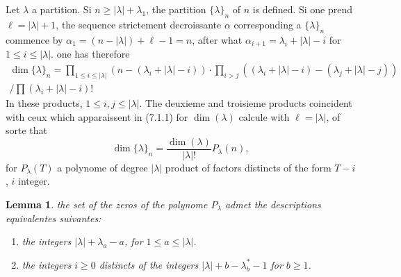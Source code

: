\documentclass[11pt,a4paper]{article}
\theoremstyle{plain}
\newtheorem{lemma}[theorem]{Lemma}
\theoremstyle{definition}
\begin{document}
\subsection{}
Let $\lambda$ a partition. Si $n \geq |\lambda| + \lambda_1$, the partition $\{\lambda\}_n$ of $n$ is defined. Si one prend $\ell = |\lambda| + 1$, the sequence strictement decroissante $\alpha$ corresponding a $\{\lambda\}_n$ commence by $\alpha_1 = (n - |\lambda|) + \ell - 1 = n$, after what $\alpha_{i+1} = \lambda_i + |\lambda| - i$ for $1 \leq i \leq |\lambda|$. one has therefore
\begin{multline}
\dim \{\lambda\}_n = \prod_{1 \leq i \leq |\lambda|} (n - (\lambda_i + |\lambda| - i)) \cdot \prod_{i > j} ((\lambda_i + |\lambda| - i) - (\lambda_j + |\lambda| - j)) \\
/ \prod (\lambda_i + |\lambda| - i)! \tag{7.2.1}
\end{multline}
In these products, $1 \leq i, j \leq |\lambda|$. The deuxieme and troisieme products coincident with ceux which apparaissent in (7.1.1) for $\dim(\lambda)$ calcule with $\ell = |\lambda|$, of sorte that
\begin{equation}
\dim \{\lambda\}_n = \frac{\dim(\lambda)}{|\lambda|!} P_\lambda(n), \tag{7.2.2}
\end{equation}
for $P_\lambda(T)$ a polynome of degree $|\lambda|$ product of factors distincts of the form $T - i$, $i$ integer.

\begin{lemma}
the set of the zeros of the polynome $P_\lambda$ admet the descriptions equivalentes suivantes:
\begin{enumerate}[label=(\roman*)]
\item the integers $|\lambda| + \lambda_a - a$, for $1 \leq a \leq |\lambda|$.
\item the integers $i \geq 0$ distincts of the integers $|\lambda| + b - \lambda^*_b - 1$ for $b \geq 1$.
\end{enumerate}
\end{lemma}
\end{document}

